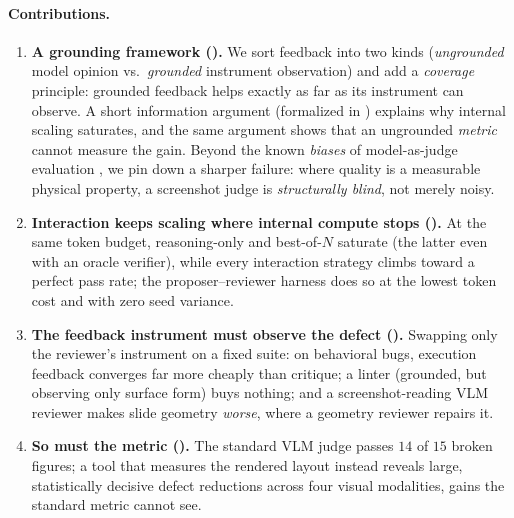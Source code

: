 \paragraph{Contributions.}
\begin{enumerate}[leftmargin=1.4em,itemsep=1pt,topsep=2pt]
\item \textbf{A grounding framework ().} We sort feedback into two kinds (\emph{ungrounded} model opinion vs.\ \emph{grounded} instrument observation) and add a \emph{coverage} principle: grounded feedback helps exactly as far as its instrument can observe. A short information argument (formalized in ) explains why internal scaling saturates, and the same argument shows that an ungrounded \emph{metric} cannot measure the gain. Beyond the known \emph{biases} of model-as-judge evaluation \citep{zheng2023judging}, we pin down a sharper failure: where quality is a measurable physical property, a screenshot judge is \emph{structurally blind}, not merely noisy.
\item \textbf{Interaction keeps scaling where internal compute stops ().} At the same token budget, reasoning-only and best-of-$N$ saturate (the latter even with an oracle verifier), while every interaction strategy climbs toward a perfect pass rate; the proposer--reviewer harness does so at the lowest token cost and with zero seed variance.
\item \textbf{The feedback instrument must observe the defect ().} Swapping only the reviewer's instrument on a fixed suite: on behavioral bugs, execution feedback converges far more cheaply than critique; a linter (grounded, but observing only surface form) buys nothing; and a screenshot-reading VLM reviewer makes slide geometry \emph{worse}, where a geometry reviewer repairs it.
\item \textbf{So must the metric ().} The standard VLM judge passes $14$ of $15$ broken figures; a tool that measures the rendered layout instead reveals large, statistically decisive defect reductions across four visual modalities, gains the standard metric cannot see.
\end{enumerate}
